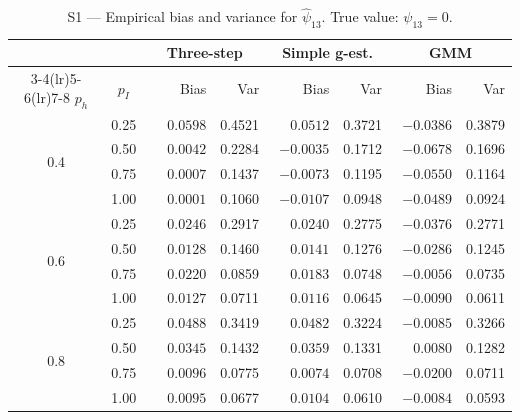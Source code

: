 \documentclass[12pt]{article}
\begin{document}
\begin{table}[htbp]
\centering
\caption{S1 --- Empirical bias and variance for $\hat\psi_{13}$.
         True value: $\psi_{13}=0$.}
\label{tab:s1_psi13}
\small
\begin{tabular}{cc rr rr rr}
\toprule
& & \multicolumn{2}{c}{Three-step} & \multicolumn{2}{c}{Simple g-est.} & \multicolumn{2}{c}{GMM} \\
\cmidrule(lr){3-4}\cmidrule(lr){5-6}\cmidrule(lr){7-8}
$p_h$ & $p_I$ & Bias & Var & Bias & Var & Bias & Var \\
\midrule
\multirow{4}{*}{0.4}
 & 0.25 & $\phantom{-}0.0598$ & 0.4521 & $\phantom{-}0.0512$ & 0.3721 & $-0.0386$ & 0.3879 \\
 & 0.50 & $\phantom{-}0.0042$ & 0.2284 & $-0.0035$ & 0.1712 & $-0.0678$ & 0.1696 \\
 & 0.75 & $\phantom{-}0.0007$ & 0.1437 & $-0.0073$ & 0.1195 & $-0.0550$ & 0.1164 \\
 & 1.00 & $\phantom{-}0.0001$ & 0.1060 & $-0.0107$ & 0.0948 & $-0.0489$ & 0.0924 \\
\midrule
\multirow{4}{*}{0.6}
 & 0.25 & $\phantom{-}0.0246$ & 0.2917 & $\phantom{-}0.0240$ & 0.2775 & $-0.0376$ & 0.2771 \\
 & 0.50 & $\phantom{-}0.0128$ & 0.1460 & $\phantom{-}0.0141$ & 0.1276 & $-0.0286$ & 0.1245 \\
 & 0.75 & $\phantom{-}0.0220$ & 0.0859 & $\phantom{-}0.0183$ & 0.0748 & $-0.0056$ & 0.0735 \\
 & 1.00 & $\phantom{-}0.0127$ & 0.0711 & $\phantom{-}0.0116$ & 0.0645 & $-0.0090$ & 0.0611 \\
\midrule
\multirow{4}{*}{0.8}
 & 0.25 & $\phantom{-}0.0488$ & 0.3419 & $\phantom{-}0.0482$ & 0.3224 & $-0.0085$ & 0.3266 \\
 & 0.50 & $\phantom{-}0.0345$ & 0.1432 & $\phantom{-}0.0359$ & 0.1331 & $\phantom{-}0.0080$ & 0.1282 \\
 & 0.75 & $\phantom{-}0.0096$ & 0.0775 & $\phantom{-}0.0074$ & 0.0708 & $-0.0200$ & 0.0711 \\
 & 1.00 & $\phantom{-}0.0095$ & 0.0677 & $\phantom{-}0.0104$ & 0.0610 & $-0.0084$ & 0.0593 \\
\bottomrule
\end{tabular}
\end{table}
\end{document}
